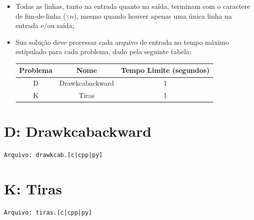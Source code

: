 \documentclass[12pt,oneside]{article} %
\begin{document}
\begin{itemize}
    \item Todas as linhas, tanto na entrada quanto na saída, terminam com o
    caractere de fim-de-linha ($\backslash n$), mesmo quando houver apenas uma única
    linha na entrada e/ou saída;

    \item Sua solução deve processar cada arquivo de entrada no tempo máximo
    estipulado para cada problema, dado pela seguinte tabela:

    \begin{table}[h]
    \centering
    \begin{tabular}{|c|c||c|}
    \hline
    \textbf{Problema} & \textbf{Nome} & \textbf{Tempo Limite (segundos)} \\
    \hline
    D & Drawkcabackward & 1 \\
    \hline
    K & Tiras & 1 \\
    \hline
    \end{tabular}
    \end{table}

\end{itemize}

\newpage
\section*{D: Drawkcabackward } %
\vspace{-0.52cm}
\noindent \begin{verbatim}Arquivo: drawkcab.[c|cpp|py]\end{verbatim}


\newpage
\section*{K: Tiras } %
\vspace{-0.52cm}
\noindent \begin{verbatim}Arquivo: tiras.[c|cpp|py]\end{verbatim}

\end{document}
